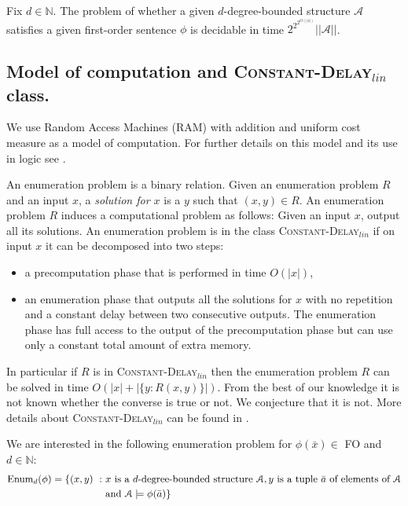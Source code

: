 \documentclass{LMCS}
\newcommand{\CDlin}{{\textsc{Constant-}\textsc{Delay}$_{lin}$}\xspace}
\newcommand\set[1]{\ensuremath{\{#1\}}\xspace}
\newcommand\cA{\ensuremath{{\mathcal A}}\xspace}
\newcommand\FO{\textup{FO}\xspace}
\begin{document}
\begin{thm}\label{Seese}
  Fix $d \in \mathbb{N}$. The problem of whether a given $d$-degree-bounded
  structure $\cA$ satisfies a given first-order sentence $\phi$ is decidable in
  time $2^{2^{2^{O(|\phi|)}}}||\cA||$.
\end{thm}

\subsection{Model of computation and \CDlin class.}

We use Random Access Machines (RAM) with addition and uniform cost measure as a
model of computation. For further details on this model and its use in logic
see \cite{DurandGrandjean07}.

An enumeration problem is a binary relation. Given an enumeration problem $R$
and an input $x$, a \emph{solution for $x$} is a $y$ such that $(x,y) \in R$.
An enumeration problem $R$ induces a computational problem as follows: Given an
input $x$, output all its solutions. An enumeration problem is in the class
\CDlin if on input $x$ it can be decomposed into two steps:
\begin{itemize}
	\item a precomputation phase that is performed in time $O(|x|)$,
	\item an enumeration phase that outputs all the solutions for $x$ with
          no repetition and a constant delay between two consecutive
          outputs. The enumeration phase has full access to the output of the
          precomputation phase but can use only a constant total amount of extra memory.
\end{itemize}
In particular if $R$ is in \CDlin then the enumeration problem $R$ can be
solved in time $O(|x|+|\set{y: R(x,y)}|)$.  From the best of our knowledge it
is not known whether the converse is true or not. We conjecture that it is not.
More details about \CDlin can be found in \cite{DurandGrandjean07}.

\newcommand{\olex}{\ensuremath{<_{\text{lex}}}}
We are interested in the following enumeration problem for $\phi(\bar x) \in$
\FO and $d\in \mathbb{N}$: 
\begin{align*}
\text{Enum}_d(\phi)=\set{(x,y) ~:~ &x \text{ is a }
  d\text{-degree-bounded structure } \cA, y \text{ is a tuple } \bar a \text{
    of elements of }\cA\\ &\text{and } \cA\models \phi(\bar a)}
\end{align*}
\end{document}
